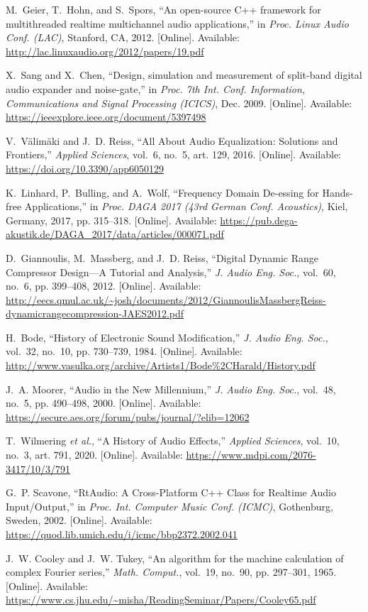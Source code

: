 \documentclass[conference]{IEEEtran}
\begin{document}
\begin{thebibliography}{99}

 M.~Geier, T.~Hohn, and S.~Spors, “An open-source C++ framework for multithreaded realtime multichannel audio applications,” in \emph{Proc. Linux Audio Conf. (LAC)}, Stanford, CA, 2012. [Online]. Available: \url{http://lac.linuxaudio.org/2012/papers/19.pdf}

 X.~Sang and X.~Chen, “Design, simulation and measurement of split-band digital audio expander and noise-gate,” in \emph{Proc. 7th Int. Conf. Information, Communications and Signal Processing (ICICS)}, Dec. 2009. [Online]. Available: \url{https://ieeexplore.ieee.org/document/5397498}

 V.~V{\"a}lim{\"a}ki and J.~D. Reiss, “All About Audio Equalization: Solutions and Frontiers,” \emph{Applied Sciences}, vol.~6, no.~5, art. 129, 2016. [Online]. Available: \url{https://doi.org/10.3390/app6050129}

 K.~Linhard, P.~Bulling, and A.~Wolf, “Frequency Domain De-essing for Hands-free Applications,” in \emph{Proc. DAGA 2017 (43rd German Conf. Acoustics)}, Kiel, Germany, 2017, pp. 315–318. [Online]. Available: \url{https://pub.dega-akustik.de/DAGA_2017/data/articles/000071.pdf}

 D.~Giannoulis, M.~Massberg, and J.~D. Reiss, “Digital Dynamic Range Compressor Design—A Tutorial and Analysis,” \emph{J. Audio Eng. Soc.}, vol.~60, no.~6, pp. 399–408, 2012. [Online]. Available: \url{http://eecs.qmul.ac.uk/~josh/documents/2012/GiannoulisMassbergReiss-dynamicrangecompression-JAES2012.pdf}

 H.~Bode, “History of Electronic Sound Modification,” \emph{J. Audio Eng. Soc.}, vol.~32, no.~10, pp. 730–739, 1984. [Online]. Available: \url{http://www.vasulka.org/archive/Artists1/Bode\%2CHarald/History.pdf}

 J.~A. Moorer, “Audio in the New Millennium,” \emph{J. Audio Eng. Soc.}, vol.~48, no.~5, pp. 490–498, 2000. [Online]. Available: \url{https://secure.aes.org/forum/pubs/journal/?elib=12062}

 T.~Wilmering \emph{et al.}, “A History of Audio Effects,” \emph{Applied Sciences}, vol.~10, no.~3, art. 791, 2020. [Online]. Available: \url{https://www.mdpi.com/2076-3417/10/3/791}

 G.~P. Scavone, “RtAudio: A Cross-Platform C++ Class for Realtime Audio Input/Output,” in \emph{Proc. Int. Computer Music Conf. (ICMC)}, Gothenburg, Sweden, 2002. [Online]. Available: \url{https://quod.lib.umich.edu/i/icmc/bbp2372.2002.041}

 J.~W. Cooley and J.~W. Tukey, “An algorithm for the machine calculation of complex Fourier series,” \emph{Math. Comput.}, vol.~19, no.~90, pp. 297–301, 1965. [Online]. Available: \url{https://www.cs.jhu.edu/~misha/ReadingSeminar/Papers/Cooley65.pdf}

\end{thebibliography}
\end{document}
